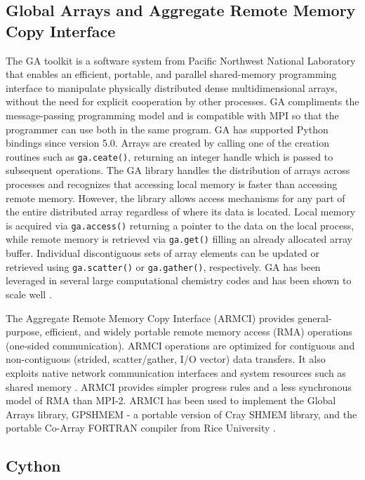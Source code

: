 \documentclass{sigplanconf}
\begin{document}
\subsection{Global Arrays and Aggregate Remote Memory Copy Interface}

The GA toolkit \cite{Nie06,Nie10,Pnl11} is a software system from Pacific
Northwest National Laboratory that enables an efficient, portable, and
parallel shared-memory programming interface to manipulate physically
distributed dense multidimensional arrays, without the need for explicit
cooperation by other processes. GA compliments the message-passing programming
model and is compatible with MPI so that the programmer can use both in the
same program. GA has supported Python bindings since version 5.0. Arrays are
created by calling one of the creation routines such as \verb=ga.ceate()=,
returning an integer handle which is passed to subsequent operations. The GA
library handles the distribution of arrays across processes and recognizes
that accessing local memory is faster than accessing remote memory. However,
the library allows access mechanisms for any part of the entire distributed
array regardless of where its data is located. Local memory is acquired via
\verb=ga.access()= returning a pointer to the data on the local process, while
remote memory is retrieved via \verb=ga.get()= filling an already allocated
array buffer. Individual discontiguous sets of array elements can be updated
or retrieved using \verb=ga.scatter()= or \verb=ga.gather()=, respectively.
GA has been leveraged in several large computational chemistry codes and has
been shown to scale well \cite{Apr09}.

The Aggregate Remote Memory Copy Interface (ARMCI) provides general-purpose,
efficient, and widely portable remote memory access (RMA) operations
(one-sided communication). ARMCI operations are optimized for contiguous and
non-contiguous (strided, scatter/gather, I/O vector) data transfers. It also
exploits native network communication interfaces and system resources such as
shared memory \cite{Nie00}.  ARMCI provides simpler progress rules and a less
synchronous model of RMA than MPI-2. ARMCI has been used to implement the
Global Arrays library, GPSHMEM - a portable version of Cray SHMEM library, and
the portable Co-Array FORTRAN compiler from Rice University \cite{Dot04}.

\subsection{Cython}
\end{document}

